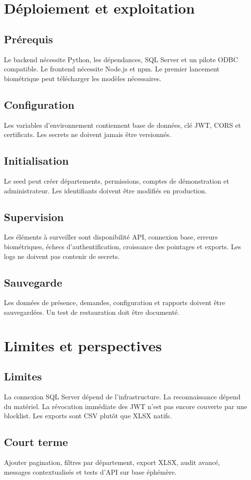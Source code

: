 \documentclass[11pt,a4paper,oneside]{report}
\begin{document}
\chapter{Déploiement et exploitation}
\section{Prérequis}
Le backend nécessite Python, les dépendances, SQL Server et un pilote ODBC compatible. Le frontend nécessite Node.js et npm. Le premier lancement biométrique peut télécharger les modèles nécessaires.
\section{Configuration}
Les variables d'environnement contiennent base de données, clé JWT, CORS et certificats. Les secrets ne doivent jamais être versionnés.
\section{Initialisation}
Le seed peut créer départements, permissions, comptes de démonstration et administrateur. Les identifiants doivent être modifiés en production.
\section{Supervision}
Les éléments à surveiller sont disponibilité API, connexion base, erreurs biométriques, échecs d'authentification, croissance des pointages et exports. Les logs ne doivent pas contenir de secrets.
\section{Sauvegarde}
Les données de présence, demandes, configuration et rapports doivent être sauvegardées. Un test de restauration doit être documenté.

\chapter{Limites et perspectives}
\section{Limites}
La connexion SQL Server dépend de l'infrastructure. La reconnaissance dépend du matériel. La révocation immédiate des JWT n'est pas encore couverte par une blocklist. Les exports sont CSV plutôt que XLSX natifs.
\section{Court terme}
Ajouter pagination, filtres par département, export XLSX, audit avancé, messages contextualisés et tests d'API sur base éphémère.
\end{document}

